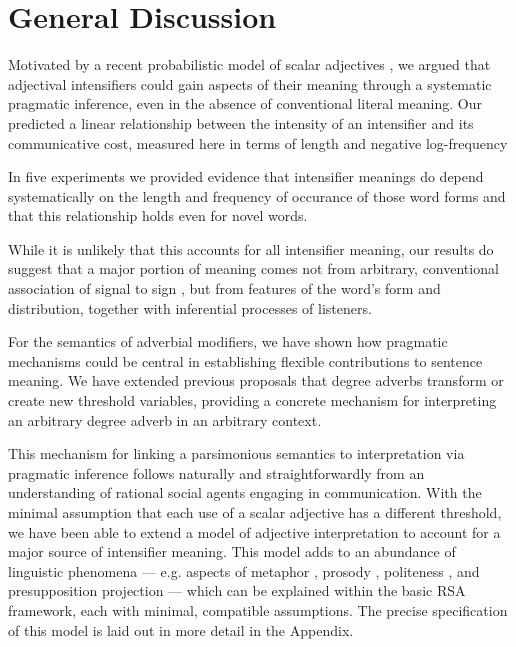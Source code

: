 


\section{General Discussion}

Motivated by a recent probabilistic model of scalar adjectives \cite{lassiter_context_2013}, we argued that adjectival intensifiers could gain aspects of their meaning through a systematic pragmatic inference, even in the absence of conventional literal meaning.
Our  predicted a linear relationship between the intensity of an intensifier and its communicative cost, measured here in terms of length and negative log-frequency%

In five experiments we provided evidence that intensifier meanings do depend systematically on the length and frequency of occurance of those word forms and that this relationship holds even for novel words.

While it is unlikely that this accounts for all intensifier meaning, our results do suggest that a major portion of meaning comes not from arbitrary, conventional association of signal to sign \cite{de_saussure_nature_1916}, but from features of the word's form and distribution, together with inferential processes of listeners.

For the semantics of adverbial modifiers, we have shown how pragmatic mechanisms could be central in establishing flexible contributions to sentence meaning.
We have extended previous proposals that degree adverbs transform or create new threshold variables, providing a concrete mechanism for interpreting an arbitrary degree adverb in an arbitrary context.

This mechanism for linking a parsimonious semantics to interpretation via pragmatic inference follows naturally and straightforwardly from an understanding of rational social agents engaging in communication.
With the minimal assumption that each use of a scalar adjective has a different threshold, we have been able to extend a model of adjective interpretation to account for a major source of intensifier meaning.
This model adds to an abundance of linguistic phenomena --- e.g. aspects of metaphor \cite{kao_formalizing_2014}, prosody \cite{bergen_strategic_2015}, politeness \cite{yoon_i_2017}, and presupposition projection \cite{qing_rational_2016} --- which can be explained within the basic RSA framework, each with minimal, compatible assumptions.
The precise specification of this model is laid out in more detail in the Appendix.

